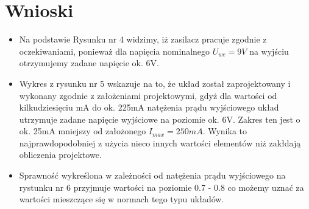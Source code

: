 \documentclass[a4paper,12pt]{article}
\begin{document}



\section {Wnioski}

\begin{itemize}
  \item Na podstawie Rysunku nr 4 widzimy, iż zasilacz pracuje zgodnie z oczekiwaniami, ponieważ dla 
	napięcia nominalnego $U_{we} = 9V$ na wyjściu otrzymujemy zadane napięcie ok. 6V.
  \item Wykres z rysunku nr 5 wskazuje na to, że układ został zaprojektowany i wykonany zgodnie z założeniami
	projektowymi, gdyż dla wartości od kilkudziesięciu mA do ok. 225mA natężenia prądu wyjściowego 
	układ utrzymuje zadane napięcie wyjściowe na poziomie ok. 6V. Zakres ten jest o ok. 25mA mniejszy
	od założonego $I_{max} = 250mA$. Wynika to najprawdopodobniej z użycia nieco innych wartości
	elementów niż zakłdają obliczenia projektowe.
  \item Sprawność wykreślona w zależności od natężenia prądu wyjściowego na rystunku nr 6 przyjmuje 
	wartości na poziomie 0.7 - 0.8 co możemy uznać za wartości mieszczące się w normach tego typu układów.
\end{itemize}
\end{document}
